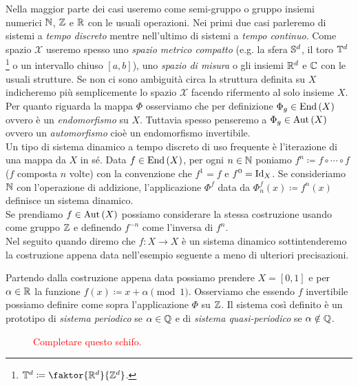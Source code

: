 Nella maggior parte dei casi useremo come semi-gruppo o gruppo insiemi numerici $ \N $, $ \Z $ e $ \R $ con le usuali operazioni. Nei primi due casi parleremo di sistemi a \emph{tempo discreto} mentre nell'ultimo di sistemi a \emph{tempo continuo}. Come spazio $ \mathcal{X} $ useremo spesso uno \emph{spazio metrico compatto} (e.g. la sfera $ \S^d $, il toro $ \T^d $ \footnote{$ \T^d \coloneqq \faktor{\R^d}{\Z^d} $.} o un intervallo chiuso $ [a, b] $), uno \emph{spazio di misura} o gli insiemi $ \R^d $ e $ \C $ con le usuali strutture. Se non ci sono ambiguità circa la struttura definita su $ X $ indicheremo più semplicemente lo spazio $ \mathcal{X} $ facendo rifermento al solo insieme $ X $. \\

Per quanto riguarda la mappa $ \Phi $ osserviamo che per definizione $ \Phi_g \in \End{(X)} $ ovvero è un \emph{endomorfismo} su $ X $. Tuttavia spesso penseremo a $ \Phi_g \in \Aut{(X)} $ ovvero un \emph{automorfismo} cioè un endomorfismo invertibile. \\

Un tipo di sistema dinamico a tempo discreto di uso frequente è l'iterazione di una mappa da $ X $ in sé. Data $ f \in \End{(X)} $, per ogni $ n \in \N $ poniamo $ f^n \coloneqq f \circ \cdots \circ f $ ($ f $ composta $ n $ volte) con la convenzione che $ f^1 = f $ e $ f^0 = \Id_X $. Se consideriamo $ \N $ con l'operazione di addizione, l'applicazione $ \Phi^f $ data da $ \Phi_n^f(x) \coloneqq f^n(x) $ definisce un sistema dinamico. \\
Se prendiamo $ f \in \Aut{(X)} $ possiamo considerare la stessa costruzione usando come gruppo $ \Z $ e definendo $ f^{-n} $ come l'inversa di $ f^n $. \\
Nel seguito quando diremo che $ f \colon X \to X $ è un sistema dinamico sottintenderemo la costruzione appena data nell'esempio seguente a meno di ulteriori precisazioni. 


\begin{example}
	Partendo dalla costruzione appena data possiamo prendere $ X = [0, 1] $ e per $ \alpha \in \R $ la funzione $ f(x) \coloneqq x + \alpha \pmod{1} $. Osserviamo che essendo $ f $ invertibile possiamo definire come sopra l'applicazione $ \Phi $ su $ \Z $. Il sistema così definito è un prototipo di \emph{sistema periodico} se $ \alpha \in \Q $ e di \emph{sistema quasi-periodico} se $ \alpha \notin \Q $. 
	\iffigureon
	\begin{figure}[h!]
		\centering
		
		\caption{\textcolor{red}{Completare questo schifo.}}
	\end{figure}
	\fi
\end{example}


